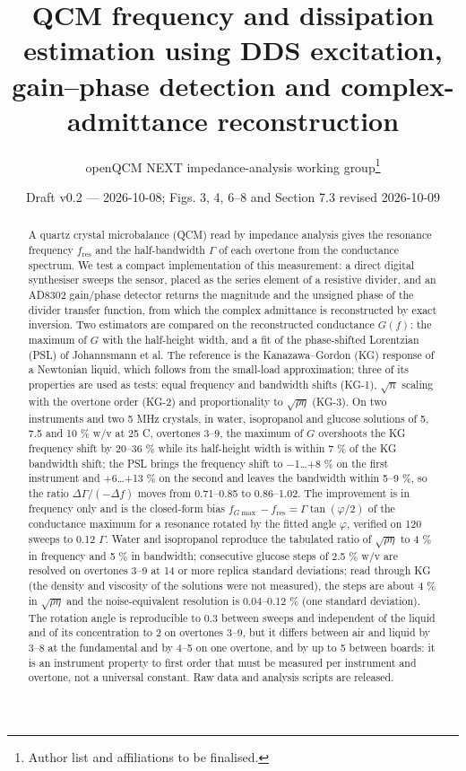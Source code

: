 \documentclass[11pt,a4paper]{article}
\title{QCM frequency and dissipation estimation using DDS excitation, gain--phase detection and complex-admittance reconstruction}
\author{openQCM NEXT impedance-analysis working group\thanks{Author list and affiliations to be finalised.}}
\date{Draft v0.2 --- 2026-10-08; Figs. 3, 4, 6--8 and Section 7.3 revised 2026-10-09}
\begin{document}
\maketitle
\begin{abstract}
A quartz crystal microbalance (QCM) read by impedance analysis gives the resonance frequency $f_\mathrm{res}$ and the half-bandwidth $\Gamma$ of each overtone from the conductance spectrum. We test a compact implementation of this measurement: a direct digital synthesiser sweeps the sensor, placed as the series element of a resistive divider, and an AD8302 gain/phase detector returns the magnitude and the unsigned phase of the divider transfer function, from which the complex admittance is reconstructed by exact inversion. Two estimators are compared on the reconstructed conductance $G(f)$: the maximum of $G$ with the half-height width, and a fit of the phase-shifted Lorentzian (PSL) of Johannsmann et al. The reference is the Kanazawa--Gordon (KG) response of a Newtonian liquid, which follows from the small-load approximation; three of its properties are used as tests: equal frequency and bandwidth shifts (KG-1), $\sqrt n$ scaling with the overtone order (KG-2) and proportionality to $\sqrt{\rho\eta}$ (KG-3). On two instruments and two 5 MHz crystals, in water, isopropanol and glucose solutions of 5, 7.5 and 10 \% w/v at 25 \textdegree{}C, overtones 3--9, the maximum of $G$ overshoots the KG frequency shift by 20--36 \% while its half-height width is within 7 \% of the KG bandwidth shift; the PSL brings the frequency shift to $-$1\ldots{}+8 \% on the first instrument and +6\ldots{}+13 \% on the second and leaves the bandwidth within 5--9 \%, so the ratio $\Delta\Gamma/(-\Delta f)$ moves from 0.71--0.85 to 0.86--1.02. The improvement is in frequency only and is the closed-form bias $f_{G\max} - f_\mathrm{res} = \Gamma\tan(\varphi/2)$ of the conductance maximum for a resonance rotated by the fitted angle $\varphi$, verified on 120 sweeps to 0.12 $\Gamma$. Water and isopropanol reproduce the tabulated ratio of $\sqrt{\rho\eta}$ to 4 \% in frequency and 5 \% in bandwidth; consecutive glucose steps of 2.5 \% w/v are resolved on overtones 3--9 at 14 or more replica standard deviations; read through KG (the density and viscosity of the solutions were not measured), the steps are about 4 \% in $\sqrt{\rho\eta}$ and the noise-equivalent resolution is 0.04--0.12 \% (one standard deviation). The rotation angle is reproducible to 0.3\textdegree{} between sweeps and independent of the liquid and of its concentration to 2\textdegree{} on overtones 3--9, but it differs between air and liquid by 3--8\textdegree{} at the fundamental and by 4--5\textdegree{} on one overtone, and by up to 5\textdegree{} between boards: it is an instrument property to first order that must be measured per instrument and overtone, not a universal constant. Raw data and analysis scripts are released.
\end{abstract}
\end{document}
